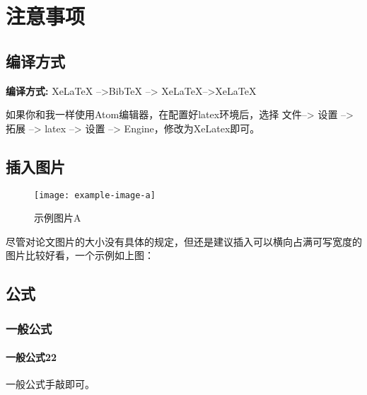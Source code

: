 \documentclass[AutoFakeBold]{LZUThesis-PgD&PhD}
\begin{document}
\mainmatter

\chapter{注意事项}

\section{编译方式}

{\bfseries 编译方式:} XeLaTeX -->BibTeX --> XeLaTeX-->XeLaTeX

如果你和我一样使用Atom编辑器，在配置好latex环境后，选择 文件--> 设置 --> 拓展 --> latex --> 设置 --> Engine，修改为XeLatex即可。

\section{插入图片}

\begin{figure}[hbt!]
  \texttt{[image: example-image-a]}
  \centering
  \caption{示例图片A}
  \label{fig:obj_dect}
\end{figure}

尽管对论文图片的大小没有具体的规定，但还是建议插入可以横向占满可写宽度的图片比较好看，一个示例如上图：




\section{公式}

\subsection{一般公式}
\subsubsection{一般公式22}

一般公式手敲即可。

\end{document}
